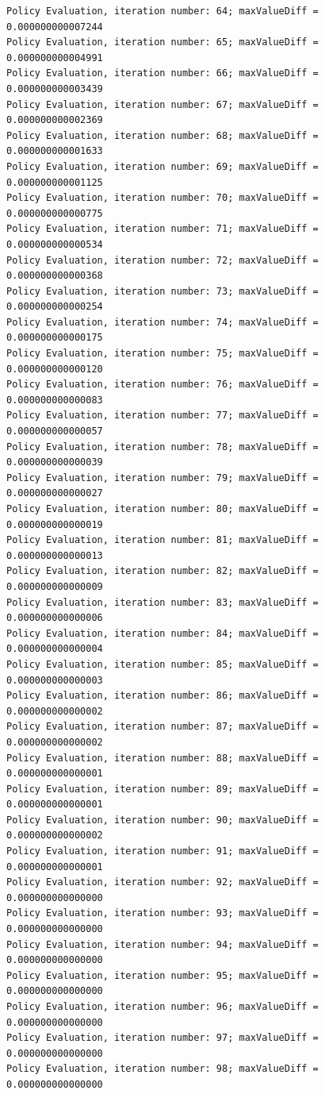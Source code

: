 \documentclass{article}
\begin{document}
\begin{scriptsize}
\begin{verbatim}
Policy Evaluation, iteration number: 64; maxValueDiff = 0.000000000007244 
Policy Evaluation, iteration number: 65; maxValueDiff = 0.000000000004991 
Policy Evaluation, iteration number: 66; maxValueDiff = 0.000000000003439 
Policy Evaluation, iteration number: 67; maxValueDiff = 0.000000000002369 
Policy Evaluation, iteration number: 68; maxValueDiff = 0.000000000001633 
Policy Evaluation, iteration number: 69; maxValueDiff = 0.000000000001125 
Policy Evaluation, iteration number: 70; maxValueDiff = 0.000000000000775 
Policy Evaluation, iteration number: 71; maxValueDiff = 0.000000000000534 
Policy Evaluation, iteration number: 72; maxValueDiff = 0.000000000000368 
Policy Evaluation, iteration number: 73; maxValueDiff = 0.000000000000254 
Policy Evaluation, iteration number: 74; maxValueDiff = 0.000000000000175 
Policy Evaluation, iteration number: 75; maxValueDiff = 0.000000000000120 
Policy Evaluation, iteration number: 76; maxValueDiff = 0.000000000000083 
Policy Evaluation, iteration number: 77; maxValueDiff = 0.000000000000057 
Policy Evaluation, iteration number: 78; maxValueDiff = 0.000000000000039 
Policy Evaluation, iteration number: 79; maxValueDiff = 0.000000000000027 
Policy Evaluation, iteration number: 80; maxValueDiff = 0.000000000000019 
Policy Evaluation, iteration number: 81; maxValueDiff = 0.000000000000013 
Policy Evaluation, iteration number: 82; maxValueDiff = 0.000000000000009 
Policy Evaluation, iteration number: 83; maxValueDiff = 0.000000000000006 
Policy Evaluation, iteration number: 84; maxValueDiff = 0.000000000000004 
Policy Evaluation, iteration number: 85; maxValueDiff = 0.000000000000003 
Policy Evaluation, iteration number: 86; maxValueDiff = 0.000000000000002 
Policy Evaluation, iteration number: 87; maxValueDiff = 0.000000000000002 
Policy Evaluation, iteration number: 88; maxValueDiff = 0.000000000000001 
Policy Evaluation, iteration number: 89; maxValueDiff = 0.000000000000001 
Policy Evaluation, iteration number: 90; maxValueDiff = 0.000000000000002 
Policy Evaluation, iteration number: 91; maxValueDiff = 0.000000000000001 
Policy Evaluation, iteration number: 92; maxValueDiff = 0.000000000000000 
Policy Evaluation, iteration number: 93; maxValueDiff = 0.000000000000000 
Policy Evaluation, iteration number: 94; maxValueDiff = 0.000000000000000 
Policy Evaluation, iteration number: 95; maxValueDiff = 0.000000000000000 
Policy Evaluation, iteration number: 96; maxValueDiff = 0.000000000000000 
Policy Evaluation, iteration number: 97; maxValueDiff = 0.000000000000000 
Policy Evaluation, iteration number: 98; maxValueDiff = 0.000000000000000 

\end{verbatim}
\end{scriptsize}
\end{document}
